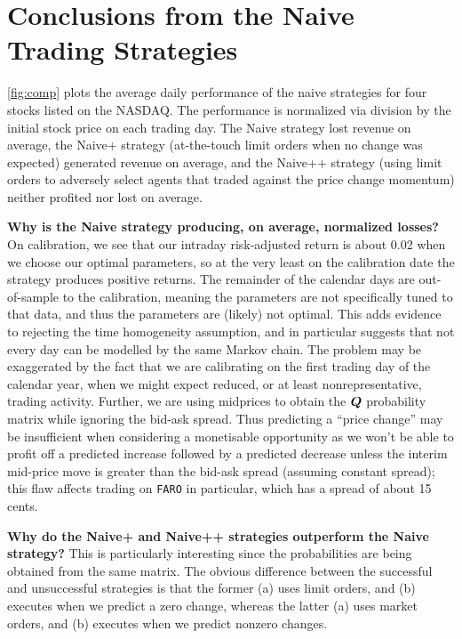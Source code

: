 \section{Conclusions from the Naive Trading Strategies}

\autoref{fig:comp} plots the average daily performance of the naive strategies for four stocks listed on the NASDAQ. The performance is normalized via division by the initial stock price on each trading day. The Naive strategy lost revenue on average, the Naive+ strategy (at-the-touch limit orders when no change was expected) generated revenue on average, and the Naive++ strategy (using limit orders to adversely select agents that traded against the price change momentum) neither profited nor lost on average.

{\bf Why is the Naive strategy producing, on average, normalized losses?} On calibration, we see that our intraday risk-adjusted return is about 0.02 when we choose our optimal parameters, so at the very least on the calibration date the strategy produces positive returns. The remainder of the calendar days are out-of-sample to the calibration, meaning the parameters are not specifically tuned to that data, and thus the parameters are (likely) not optimal. This adds evidence to rejecting the time homogeneity assumption, and in particular suggests that not every day can be modelled by the same Markov chain. The problem may be exaggerated by the fact that we are calibrating on the first trading day of the calendar year, when we might expect reduced, or at least nonrepresentative, trading activity. Further, we are using midprices to obtain the $\boldsymbol{Q}$ probability matrix while ignoring the bid-ask spread. Thus predicting a ``price change'' may be insufficient when considering a monetisable opportunity as we won't be able to profit off a predicted increase followed by a predicted decrease unless the interim mid-price move is greater than the bid-ask spread (assuming constant spread); this flaw affects trading on \texttt{FARO} in particular, which has a spread of about 15 cents.

{\bf Why do the Naive+ and Naive++ strategies outperform the Naive strategy?} This is particularly interesting since the probabilities are being obtained from the same matrix. The obvious difference between the successful and unsuccessful strategies is that the former (a) uses limit orders, and (b) executes when we predict a zero change, whereas the latter (a) uses market orders, and (b) executes when we predict nonzero changes.

